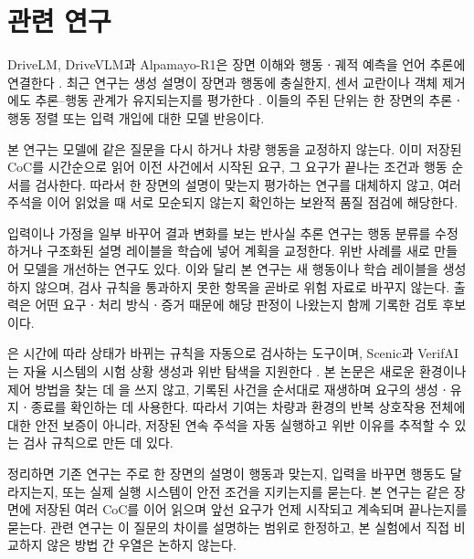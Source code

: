 \section{관련 연구}
\label{sec:related}

DriveLM, DriveVLM과 Alpamayo-R1은 장면 이해와 행동ㆍ궤적 예측을 언어 추론에 연결한다 \cite{sima2024drivelm,tian2024drivevlm,wang2025alpamayo}. 최근 연구는 생성 설명이 장면과 행동에 충실한지, 센서 교란이나 객체 제거에도 추론--행동 관계가 유지되는지를 평가한다 \cite{mayumu2026faithfulness,nguyen2026vladrivebench,priyadershi2026lostinfog,panda2026cvaa}. 이들의 주된 단위는 한 장면의 추론ㆍ행동 정렬 또는 입력 개입에 대한 모델 반응이다.

본 연구는 모델에 같은 질문을 다시 하거나 차량 행동을 교정하지 않는다. 이미 저장된 CoC를 시간순으로 읽어 이전 사건에서 시작된 요구, 그 요구가 끝나는 조건과 행동 순서를 검사한다. 따라서 한 장면의 설명이 맞는지 평가하는 연구를 대체하지 않고, 여러 주석을 이어 읽었을 때 서로 모순되지 않는지 확인하는 보완적 품질 점검에 해당한다.

입력이나 가정을 일부 바꾸어 결과 변화를 보는 반사실 추론 연구는 행동 분류를 수정하거나 구조화된 설명 레이블을 학습에 넣어 계획을 교정한다. 위반 사례를 새로 만들어 모델을 개선하는 연구도 있다. 이와 달리 본 연구는 새 행동이나 학습 레이블을 생성하지 않으며, 검사 규칙을 통과하지 못한 항목을 곧바로 위험 자료로 바꾸지 않는다. 출력은 어떤 요구ㆍ처리 방식ㆍ증거 때문에 해당 판정이 나왔는지 함께 기록한 검토 후보이다.

\uppaal{}은 시간에 따라 상태가 바뀌는 규칙을 자동으로 검사하는 도구이며, Scenic과 VerifAI는 자율 시스템의 시험 상황 생성과 위반 탐색을 지원한다 \cite{behrmann2004uppaal,fremont2019scenic,dreossi2019verifai}. 본 논문은 새로운 환경이나 제어 방법을 찾는 데 \uppaal{}을 쓰지 않고, 기록된 사건을 순서대로 재생하며 요구의 생성ㆍ유지ㆍ종료를 확인하는 데 사용한다. 따라서 기여는 차량과 환경의 반복 상호작용 전체에 대한 안전 보증이 아니라, 저장된 연속 주석을 자동 실행하고 위반 이유를 추적할 수 있는 검사 규칙으로 만든 데 있다.

정리하면 기존 연구는 주로 한 장면의 설명이 행동과 맞는지, 입력을 바꾸면 행동도 달라지는지, 또는 실제 실행 시스템이 안전 조건을 지키는지를 묻는다. 본 연구는 같은 장면에 저장된 여러 CoC를 이어 읽으며 앞선 요구가 언제 시작되고 계속되며 끝나는지를 묻는다. 관련 연구는 이 질문의 차이를 설명하는 범위로 한정하고, 본 실험에서 직접 비교하지 않은 방법 간 우열은 논하지 않는다.

